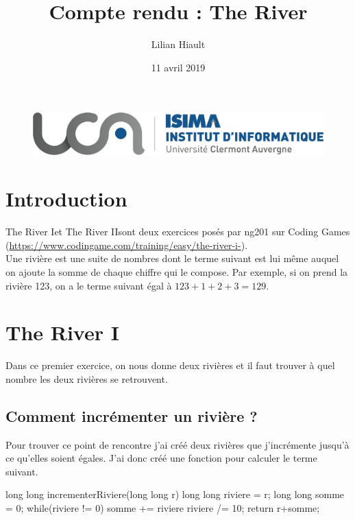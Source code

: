 \documentclass{article}
\title{Compte rendu : The River}
\author{Lilian Hiault}
\date{11 avril 2019}
\begin{document}
\begin{figure}
  \centerline{\includegraphics[scale=0.2]{logo-isima.jpeg}}
\end{figure}

\maketitle

\tableofcontents

\section*{Introduction}

\og The River I\fg et \og The River II\fg sont deux exercices posés par ng201 sur Coding Games (\url{https://www.codingame.com/training/easy/the-river-i-}).
\\ Une rivière est une suite de nombres dont le terme suivant est lui même auquel on ajoute la somme de chaque chiffre qui le compose. Par exemple, si on prend la rivière 123, on a le terme suivant égal à $123+1+2+3=129$.

\section{The River I}

Dans ce premier exercice, on nous donne deux rivières et il faut trouver à quel nombre les deux rivières se retrouvent.

\subsection{Comment incrémenter un rivière ?}

Pour trouver ce point de rencontre j'ai créé deux rivières que j'incrémente jusqu'à ce qu'elles soient égales. J'ai donc créé une fonction pour calculer le terme suivant.
\\

\begin{boxedverbatim}
  long long incrementerRiviere(long long  r)
{
    long long riviere = r;
    long long somme = 0;
    while(riviere != 0)
    {
        somme += riviere%
        riviere /= 10;
    }
    return r+somme;
}
\end{boxedverbatim}
\end{document}
